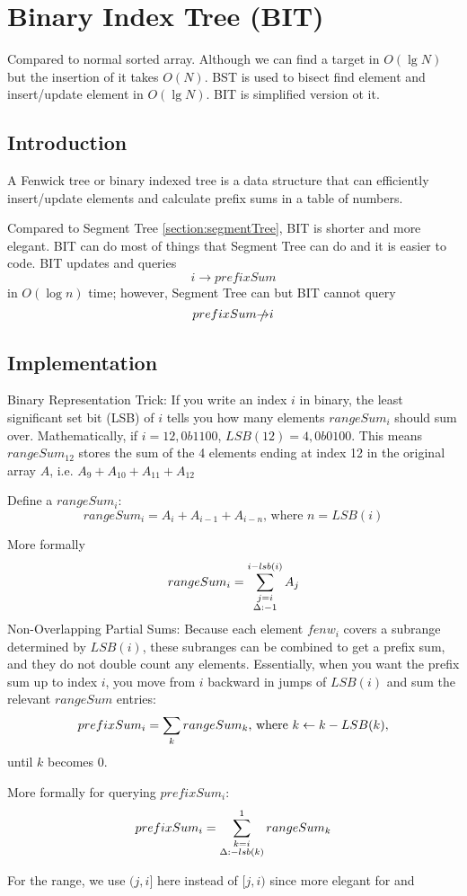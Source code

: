 \section{Binary Index Tree (BIT)}\label{BIT}
Compared to normal sorted array. Although we can find a target in $O(\lg N)$ but the insertion of it takes $O(N)$. BST is used to bisect find element and insert/update element in  $O(\lg N)$. BIT is simplified version ot it. 
\subsection{Introduction}
A Fenwick tree or binary indexed tree is a data structure that can efficiently insert/update elements and calculate prefix sums in a table of numbers.

Compared to Segment Tree \ref{section:segmentTree}, BIT is shorter and more elegant. BIT can do most of things that Segment Tree can do and it is easier to code. BIT updates and queries $$i\rightarrow prefixSum$$ in $O(\log n)$ time; however, Segment Tree can but BIT cannot query $$prefixSum \slashed{\rightarrow} i$$
\subsection{Implementation}
Binary Representation Trick: If you write an index $i$ in binary, the least significant set bit (LSB) of $i$ tells you how many elements $rangeSum_i$ should sum over. Mathematically, if $i=12, 0b1100$, $LSB(12)=4, 0b0100$. This means $rangeSum_{12}$ stores the sum of the 4 elements ending at index 12 in the original array $A$, i.e. $A_9+A_{10}+A_{11}+A_{12}$

Define a $rangeSum_i$:
$$
rangeSum_i = A_i + A_{i-1} + A_{i-n} \text{, where } n = LSB(i)
$$

More formally 
$$
rangeSum_i = \sum_{\substack{j=i \\ \Delta: -1}}^{i-lsb(i)}{A_j}
$$
Non-Overlapping Partial Sums: Because each element $fenw_i$ covers a subrange determined by $LSB(i)$, these subranges can be combined to get a prefix sum, and they do not double count any elements. Essentially, when you want the prefix sum up to index $i$, you move from $i$ backward in jumps of $LSB(i)$ and sum the relevant $rangeSum$ entries:
$$
prefixSum_i= \sum_k{rangeSum_k} \text{, where} k\la k-LSB(k),
$$
until $k$ becomes 0.

More formally for querying $prefixSum_i$:
$$
prefixSum_i = \sum_{\substack{k=i \\ \Delta: -lsb(k)}}^{1}{rangeSum_k}
$$

For the range, we use $(j, i]$ here instead of $[j, i)$ since more elegant for  and 

